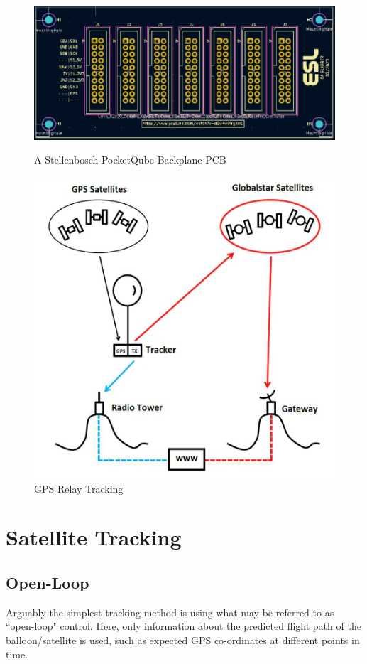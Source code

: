 \graphicspath{{./figures/}}

\begin{figure}[!htb]
  \begin{minipage}{.49\textwidth}
    \centering
    \includegraphics[width=0.98\linewidth]{pq_backplane}
    \caption{A Stellenbosch PocketQube Backplane PCB \cite{standard-pqsu}}
    \label{fig:pq_backplane}
  \end{minipage}
  \begin{minipage}{.49\textwidth}
    \centering
    \includegraphics[width=0.65\linewidth]{gps_relay}
    \caption{GPS Relay Tracking \cite{site-highaltitudescienceTrackingWeather}}
    \label{fig:gps_relay}
  \end{minipage}
\end{figure}

\section{Satellite Tracking}

\subsection{Open-Loop}
Arguably the simplest tracking method is using what may be referred to as ``open-loop" control. Here, only information about the predicted flight path of the balloon/satellite is used, such as expected GPS co-ordinates at different points in time.

